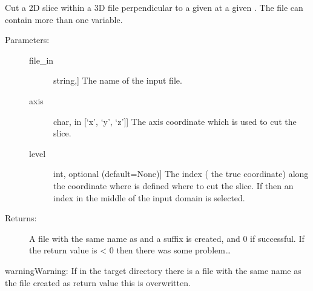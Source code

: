 \documentclass[letterpaper,10pt,english]{sphinxmanual}
\begin{document}
\begin{fulllineitems}
\label{\detokenize{appendices:s2Dcd.gslibnumpy.gslib_slice}}
Cut a 2D slice within a 3D  file perpendicular to a given
 at a given . The  file can contain more than
one variable.
\begin{description}
\item[{Parameters:}] \leavevmode\begin{description}
\item[{file\_in}] \leavevmode{[}string,{]}
The name of the input file.

\item[{axis}] \leavevmode{[}char, in {[}‘x’, ‘y’, ‘z’{]}{]}
The axis coordinate which is used to cut the slice.

\item[{level}] \leavevmode{[}int, optional (default=None){]}
The index ( the true coordinate) along the
coordinate where  is defined where to cut the slice.
If  then an index in the middle of the input
domain is selected.

\end{description}

\item[{Returns:}] \leavevmode
A file with the same name as  and a suffix
 is created, and 0 if successful.
If the return value is \textless{} 0 then there was some problem…

\end{description}

\begin{sphinxadmonition}{warning}{Warning:}
If in the target directory there is a file with the same name as the
file created as return value this is overwritten.
\end{sphinxadmonition}

\end{fulllineitems}

\end{document}
